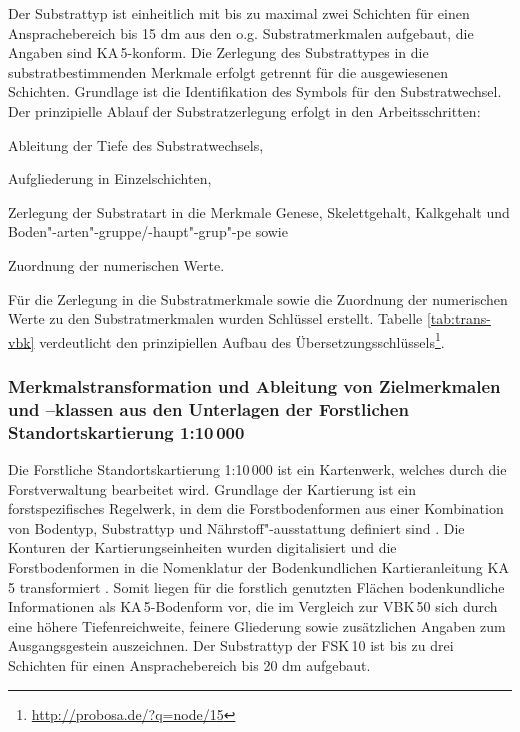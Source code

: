 Der Substrattyp ist einheitlich mit bis zu maximal zwei Schichten für einen Ansprachebereich bis 15 dm aus den o.g. Substratmerkmalen aufgebaut, die Angaben sind KA\,5-konform. Die Zerlegung des Substrattypes in die substratbestimmenden Merkmale erfolgt getrennt für die ausgewiesenen Schichten. Grundlage ist die Identifikation des Symbols für den Substratwechsel. Der prinzipielle Ablauf der Substratzerlegung erfolgt in den Arbeitsschritten:

\begin{compactenum}
	\item Ableitung der Tiefe des Substratwechsels, 
	\item Aufgliederung in Einzelschichten,
	\item Zerlegung der Substratart in die Merkmale Genese, Skelettgehalt, Kalkgehalt und Boden"-arten"-gruppe/-haupt"-grup"-pe sowie
	\item Zuordnung der numerischen Werte.
\end{compactenum}

Für die Zerlegung in die Substratmerkmale sowie die Zuordnung der numerischen Werte zu den Substratmerkmalen wurden Schlüssel erstellt. Tabelle \ref{tab:trans-vbk} verdeutlicht den prinzipiellen Aufbau des Übersetzungsschlüssels\footnote{\url{http://probosa.de/?q=node/15}}.



\subsubsection{Merkmalstransformation und Ableitung von Zielmerkmalen und –klassen aus den Unterlagen der Forstlichen Standortskartierung 1:10\,000}\label{sec:trans-fks}
Die Forstliche Standortskartierung 1:10\,000 ist ein Kartenwerk, welches durch die Forstverwaltung bearbeitet wird. Grundlage der Kartierung ist ein forstspezifisches Regelwerk, in dem die Forstbodenformen aus einer Kombination von Bodentyp, Substrattyp und Nährstoff"-ausstattung definiert sind \citep{Schwanecke1993}. Die Konturen der Kartierungseinheiten wurden digitalisiert und die Forstbodenformen in die Nomenklatur der Bodenkundlichen Kartieranleitung KA\,5 transformiert \citep{KA5}. Somit liegen für die forstlich genutzten Flächen bodenkundliche Informationen als KA\,5-Bodenform vor, die im Vergleich zur VBK\,50 sich durch eine höhere Tiefenreichweite, feinere Gliederung sowie zusätzlichen Angaben zum Ausgangsgestein auszeichnen. Der Substrattyp der FSK\,10 ist bis zu drei Schichten für einen Ansprachebereich bis 20 dm aufgebaut.\

